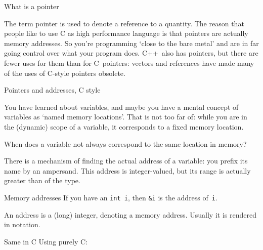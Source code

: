 
 {What is a pointer}

The term pointer is used to denote a reference to a quantity. The
reason that people like to use C as high performance language is that
pointers are actually memory addresses. So you're programming `close
to the bare metal' and are in far going control over what your program
does. C++~also has pointers, but there are fewer uses for them than
for C~pointers: vectors and references have made many of the uses
of C-style pointers obsolete.

 {Pointers and addresses, C style}
\label{sec:cderef}

You have learned about variables, and maybe you have a mental concept
of variables as `named memory locations'. That is not too far of:
while you are in the (dynamic) scope of a variable, it corresponds to
a fixed memory location.

\begin{exercise}
  \label{ex:varmemscope}
  When does a variable not always correspond to the same location in
  memory?
\end{exercise}

There is a mechanism of finding the actual address of a variable: you
prefix its name by an ampersand. 
This address is integer-valued, but
its range is actually greater than of the  type.

\begin{block}{Memory addresses}
  \label{sl:ampersand}
  If you have an \lstinline{int i}, then \lstinline{&i} is the address of~\lstinline{i}.

An address is a (long) integer, denoting a memory address. Usually it
is rendered in  notation.
%
\end{block}

\begin{block}{Same in C}
    \label{sl:ampersandc}
  Using purely C:
%
%
\end{block}

